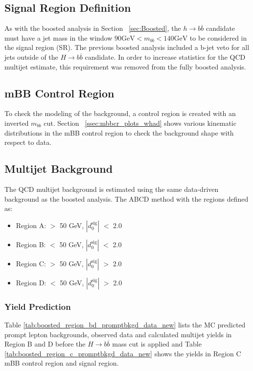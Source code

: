 \subsection{Signal Region Definition}
As with the boosted analysis in Section ~\ref{sec:Boosted}, the ${h\rightarrow b\overline{b}}$ candidate must have a jet mass in the window ${90 \mathrm{ GeV } < m_{bb} < 140 \mathrm{GeV}}$ to be considered in the signal region (SR). The previous boosted analysis included a b-jet veto for all jets outside of the ${H\rightarrow b\overline{b}}$ candidate. In order to increase statistics for the QCD multijet estimate, this requirement was removed from the fully boosted analysis.

\subsection{mBB Control Region}
To check the modeling of the background, a control region is created with an inverted ${m_{bb}}$ cut. Section ~\ref{ssec:mbbcr_plots_whad} shows various kinematic distributions in  the mBB control region to check the background shape with respect to data.
\subsection{Multijet Background}
The QCD multijet background is estimated using the same data-driven background as the boosted analysis. The ABCD method with the regions defined as:
\begin{itemize}
\item Region A: \met $>$ 50 GeV, $|d_{0}^{\textrm{sig}}|$ $<$ 2.0
\item Region B: \met $<$ 50 GeV, $|d_{0}^{\textrm{sig}}|$ $<$ 2.0
\item Region C: \met $>$ 50 GeV, $|d_{0}^{\textrm{sig}}|$ $>$ 2.0
\item Region D: \met $<$ 50 GeV, $|d_{0}^{\textrm{sig}}|$ $>$ 2.0
\end{itemize}

\subsubsection{Yield Prediction}
Table \ref{tab:boosted_region_bd_promptbkgd_data_new} lists the MC predicted prompt lepton backgrounds, observed data and calculated multijet yields in Region B and D before the ${H\rightarrow b\overline{b}}$ mass cut is applied and Table \ref{tab:boosted_region_c_promptbkgd_data_new} shows the yields in Region C mBB control region and signal region.\newline

